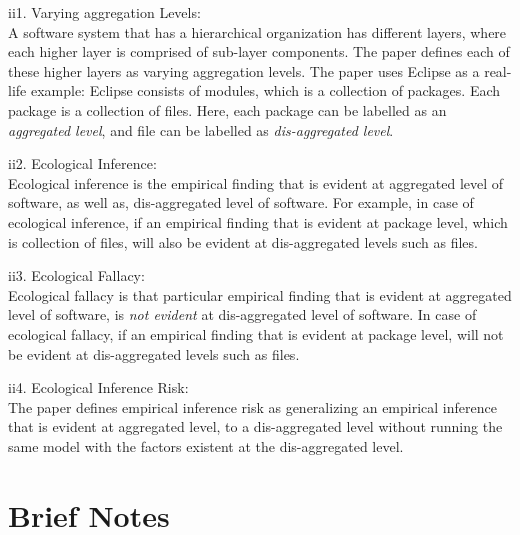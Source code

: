 \documentclass[12pt]{article}
\begin{document}
\begin{itemize}
\begin{item}
ii1. Varying aggregation Levels: \\
A software system that has a hierarchical organization has different layers, where
each higher layer is comprised of sub-layer components.  The paper defines 
each of these higher layers as varying aggregation levels. The paper uses Eclipse as a real-life
example: Eclipse consists of modules, which is a collection of packages. Each package 
is a collection of files. Here, each package can be labelled as an \textit{aggregated level}, and file can be labelled as  \textit{dis-aggregated level}.   
\end{item}
\begin{item}
ii2. Ecological Inference: \\
Ecological inference is the empirical finding that is evident at aggregated level of 
software, as well as, dis-aggregated level of software. For example, in case of ecological inference, if an empirical finding that is evident at package level, which is collection of
files, will also be evident at dis-aggregated levels such as files. 
\end{item}
\begin{item}
ii3. Ecological Fallacy: \\
Ecological fallacy is that particular empirical finding that is evident at aggregated level of software, is \textit{not evident} at dis-aggregated level of software. In case of ecological fallacy, if an empirical finding that is evident at package level, will not be evident at dis-aggregated levels such as files. 
\end{item}
\begin{item}
ii4. Ecological Inference Risk: \\
The paper defines empirical inference risk as generalizing an empirical inference that is 
evident at aggregated level, to a dis-aggregated level without running 
the same model with the factors existent at the dis-aggregated level. 
\end{item}
\end{itemize} 

\section{Brief Notes}
\label{brief}
\end{document}
